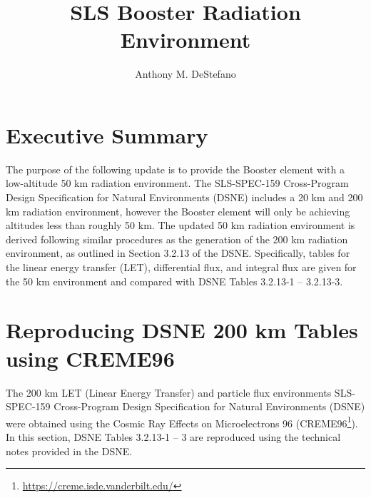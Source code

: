 \documentclass{hitec}
\title{SLS Booster Radiation Environment}
\author{Anthony M. DeStefano}
\begin{document}
\maketitle
{}

\tableofcontents
\listoffigures
\listoftables
\newpage






\cleardoublepage
{}
\section{Executive Summary}

The purpose of the following update is to provide the Booster element with
a low-altitude 50 km radiation environment. The SLS-SPEC-159 Cross-Program Design Specification for Natural Environments (DSNE) includes a 20 km and 200 km radiation environment, however the Booster element will only be achieving altitudes less than roughly 50 km. The updated 50 km radiation environment is derived following similar procedures as the generation of the 200 km radiation environment, as outlined in Section 3.2.13 of the DSNE. Specifically, tables for the linear energy transfer (LET), differential flux, and integral flux are given for the 50 km environment and compared with DSNE Tables 3.2.13-1 -- 3.2.13-3.



\newpage
\section{Reproducing DSNE 200 km Tables using CREME96}

The 200 km LET (Linear Energy Transfer) and particle flux environments SLS-SPEC-159 Cross-Program Design Specification for Natural Environments (DSNE) were obtained using the Cosmic Ray Effects on Microelectrons 96 (CREME96\footnote{\url{https://creme.isde.vanderbilt.edu/}}). In this section, DSNE Tables 3.2.13-1 -- 3 are reproduced using the technical notes provided in the DSNE.
\end{document}
